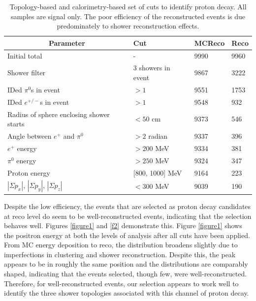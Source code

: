 \documentclass[a4paper, 10pt]{article}
\begin{document}
\begin{table}[!htbp]
\centering
\caption{Topology-based and calorimetry-based set of cuts to identify proton decay. All samples are signal only. The poor efficiency of the reconstructed events is due predominately to shower reconstruction effects.}
\begin{centering}
\begin{tabular}{|l|l|l|l|}
\hline
\multicolumn{1}{|c|}{{\bf Parameter}}    & {\bf Cut}      & {\bf MCReco} & {\bf Reco} \\ \hline
Initial total                            & -                  & 9990                      & 9960       \\ \hline
Shower filter                            & 3 showers in event         & 9867               & 3222       \\ \hline
IDed $\pi^0$s in event                   & $> 1$                     & 9551               & 1753       \\ \hline
IDed $e^{+/-}$s in event                 & $> 1$                     & 9548               & 932        \\ \hline
Radius of sphere enclosing shower starts & $< 50$ cm                  & 9373               & 546        \\ \hline
Angle between $e^+$ and $\pi^0$          & $> 2$ radian              & 9337               & 396        \\ \hline
$e^+$ energy                             & $> 200$ MeV              & 9334               & 381        \\ \hline
$\pi^0$ energy                           & $> 250$ MeV               & 9324               & 347       \\ \hline
Proton energy                            & {[}800, 1000{]} MeV         & 9164               & 223         \\ \hline
$|\Sigma p_x|$, $|\Sigma p_y|$, $|\Sigma p_z|$ & $< 300$ MeV                & 9039               & 190         \\ \hline
\end{tabular}
\end{centering}
\label{t3}
\end{table}



Despite the low efficiency, the events that are selected as proton decay candidates at reco level do seem to be well-reconstructed events, indicating that the selection behaves well. Figures \ref{figure1} and \ref{f2} demonstrate this. Figure \ref{figure1}  shows the positron energy at both the levels of analysis after all cuts have been applied. From MC energy deposition to reco, the distribution broadens slightly due to imperfections in clustering and shower reconstruction. Despite this, the peak appears to be in roughly the same position and the distributions are comparably shaped, indicating that the events selected, though few, were well-reconstructed. Therefore, for well-reconstructed events, our selection appears to work well to identify the three shower topologies associated with this channel of proton decay.
\end{document}
